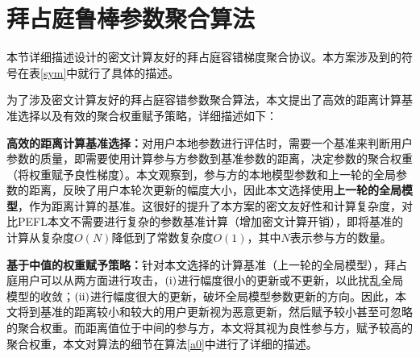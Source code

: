 \section{拜占庭鲁棒参数聚合算法}\label{friendly-alg}
本节详细描述设计的密文计算友好的拜占庭容错梯度聚合协议。本方案涉及到的符号在表\ref{sym}中就行了具体的描述。

为了涉及密文计算友好的拜占庭容错参数聚合算法，本文提出了高效的距离计算基准选择以及有效的聚合权重赋予策略，详细描述如下：
\begin{compactitem}
	\item \textbf{高效的距离计算基准选择：}对用户本地参数进行评估时，需要一个基准来判断用户参数的质量，即需要使用计算参与方参数到基准参数的距离，决定参数的聚合权重（将权重赋予良性梯度）。本文观察到，参与方的本地模型参数和上一轮的全局参数的距离，反映了用户本轮次更新的幅度大小，因此本文选择使用\textbf{上一轮的全局模型}，作为距离计算的基准。这很好的提升了本方案的密文友好性和计算复杂度，对比PEFL\cite{liu2021privacy}本文不需要进行复杂的参数基准计算（增加密文计算开销），即将基准的计算从复杂度$ O(N) $降低到了常数复杂度$ O(1) $，其中$N$表示参与方的数量。
	\item \textbf{基于中值的权重赋予策略：}针对本文选择的计算基准（上一轮的全局模型），拜占庭用户可以从两方面进行攻击，$(\rm \romannumeral1)$进行幅度很小的更新或不更新，以此扰乱全局模型的收敛；$(\rm \romannumeral2)$进行幅度很大的更新，破坏全局模型参数更新的方向。因此，本文将到基准的距离较小和较大的用户更新视为恶意更新，然后赋予较小甚至可忽略的聚合权重。而距离值位于中间的参与方，本文将其视为良性参与方，赋予较高的聚合权重，本文对算法的细节在算法\ref{a0}中进行了详细的描述。
\end{compactitem}
